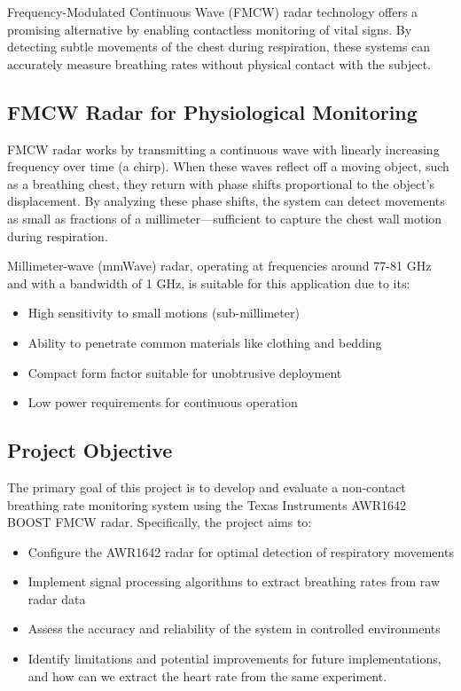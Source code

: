 \documentclass[12pt]{article}
\begin{document}
Frequency-Modulated Continuous Wave (FMCW) radar technology offers a promising alternative by enabling contactless monitoring of vital signs. By detecting subtle movements of the chest during respiration, these systems can accurately measure breathing rates without physical contact with the subject.

\subsection{FMCW Radar for Physiological Monitoring}
FMCW radar works by transmitting a continuous wave with linearly increasing frequency over time (a chirp). When these waves reflect off a moving object, such as a breathing chest, they return with phase shifts proportional to the object's displacement. By analyzing these phase shifts, the system can detect movements as small as fractions of a millimeter—sufficient to capture the chest wall motion during respiration.

Millimeter-wave (mmWave) radar, operating at frequencies around 77-81 GHz and with a bandwidth of 1 GHz, is suitable for this application due to its:
\begin{itemize}
    \item High sensitivity to small motions (sub-millimeter)
    \item Ability to penetrate common materials like clothing and bedding
    \item Compact form factor suitable for unobtrusive deployment
    \item Low power requirements for continuous operation
\end{itemize}

\subsection{Project Objective}
The primary goal of this project is to develop and evaluate a non-contact breathing rate monitoring system using the Texas Instruments AWR1642 BOOST FMCW radar. Specifically, the project aims to:
\begin{itemize}
    \item Configure the AWR1642 radar for optimal detection of respiratory movements
    \item Implement signal processing algorithms to extract breathing rates from raw radar data
    \item Assess the accuracy and reliability of the system in controlled environments
    \item Identify limitations and potential improvements for future implementations, and how can we extract the heart rate from the same experiment.
\end{itemize}
\end{document}
